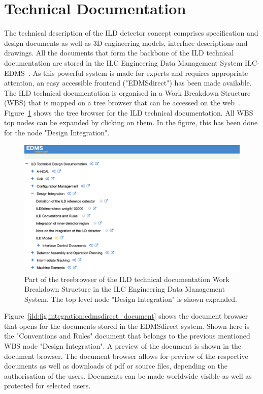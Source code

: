 \section{Technical Documentation}

The technical description of the ILD detector concept comprises specification and design documents as well as 3D engineering models, interface descriptions and drawings. All the documents that form the backbone of the ILD technical documentation are stored in the ILC Engineering Data Management System ILC-EDMS~\cite{ild:bib:edms}. As this powerful system is made for experts and requires appropriate attention, an easy accessible frontend ("EDMSdirect") has been made available. The ILD technical documentation is organised in a Work Breakdown Structure (WBS) that is mapped on a tree browser that can be accessed on the web~\cite{ild:bib:edmsdirect}. Figure~\ref{ild:fig:integration:edmsdirect} shows the tree browser for the ILD technical documentation. All WBS top nodes can be expanded by clicking on them. In the figure, this has been done for the node "Design Integration".


\begin{figure}[t!]
\centering
\includegraphics[width=0.8\hsize]{Integration/fig/EDMS_direct.png}

\caption{\label{ild:fig:integration:edmsdirect}Part of the treebrowser of the ILD technical documentation Work Breakdown Structure in the ILC Engineering Data Management System. The top level node "Design Integration" is shown expanded.}
\end{figure}

Figure~\ref{ild:fig:integration:edmsdirect_document} shows the document browser that opens for the documents stored in the EDMSdirect system. Shown here is the "Conventions and Rules" document that belongs to the previous mentioned WBS node "Design Integration". A preview of the document is shown in the document browser. The document browser allows for preview of the respective documents as well as downloads of pdf or source files, depending on the authorisation of the users. Documents can be made worldwide visible as well as protected for selected users.

